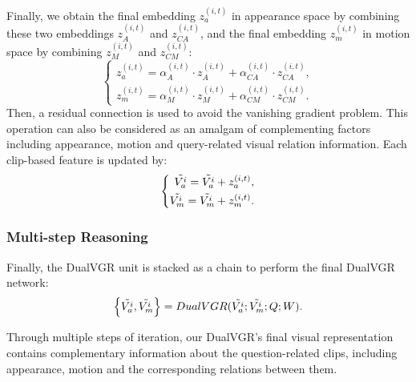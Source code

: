 \documentclass[journal]{IEEEtran}
\begin{document}
Finally, we obtain the final embedding $z^{\left(i,t\right)}_a$ in appearance space by combining these two embeddings $z^{\left(i,t\right)}_A$ and $ z^{\left(i,t\right)}_{CA}$, and the final embedding $z^{\left(i,t\right)}_m$ in motion space by combining $z^{\left(i,t\right)}_M$ and $ z^{\left(i,t\right)}_{CM}$:
\begin{equation}
\left\{
\begin{aligned}
    z^{\left(i,t\right)}_a = \alpha^{\left(i,t\right)}_A \cdot z^{\left(i,t\right)}_A + \alpha^{\left(i,t\right)}_{CA} \cdot z^{\left(i,t\right)}_{CA}, \\
    z^{\left(i,t\right)}_m = \alpha^{\left(i,t\right)}_M \cdot z^{\left(i,t\right)}_M + \alpha^{\left(i,t\right)}_{CM} \cdot z^{\left(i,t\right)}_{CM}.
    \end{aligned} \label{eq:attn_final}
    \right.
\end{equation} 
Then, a residual connection \cite{he2016deep} is used to avoid the vanishing gradient problem. This operation can also be considered as an amalgam of complementing factors including appearance, motion and query-related visual relation information. Each clip-based feature is updated by:
\begin{equation}
    \left\{
\begin{aligned}
    \Tilde{V^i_a} = \Tilde{V^i_a} + z^{(i,t)}_a, \\
    \Tilde{V^i_m} = \Tilde{V^i_m} + z^{(i,t)}_m.
    \end{aligned}
    \right.
\end{equation}

\subsubsection{Multi-step Reasoning} 
Finally, the DualVGR unit is stacked as a chain to perform the final DualVGR network:
\begin{equation}
    \left\{\Tilde{V^i_a},\Tilde{V^i_m}\right\} = DualVGR(\Tilde{V^i_a};\Tilde{V^i_m};Q;W).
\end{equation}

Through multiple steps of iteration, our DualVGR's final visual representation contains complementary information about the question-related clips, including appearance, motion and the corresponding relations between them. 
\end{document}
